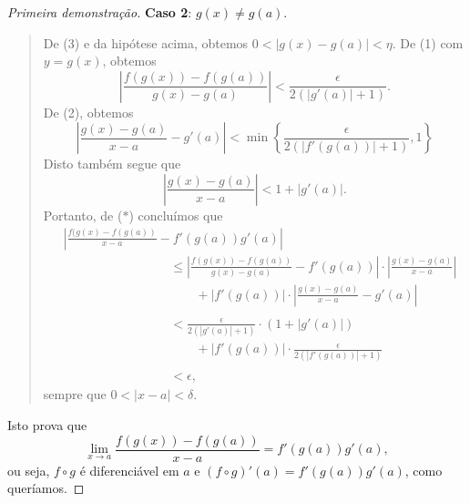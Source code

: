 \begin{proof}[Primeira demonstração]
	\textbf{Caso 2}: $g(x)\neq g(a)$.
	\begin{quote}
		De (3) e da hipótese acima, obtemos $0<|g(x)-g(a)|<\eta$. De (1) com $y=g(x)$, obtemos
		\[\left|\frac{f(g(x))-f(g(a))}{g(x)-g(a)}\right|<\frac{\epsilon}{2(|g'(a)|+1)}.\]
		De (2), obtemos
		\[\left|\frac{g(x)-g(a)}{x-a}-g'(a)\right|<\min\left\{\frac{\epsilon}{2(|f'(g(a))|+1)},1\right\}\]
		Disto também segue que
		\[\left|\frac{g(x)-g(a)}{x-a}\right|< 1+|g'(a)|.\]
		Portanto, de ($\ast$) concluímos que
		\begin{align*}
		&\left|\frac{f(g(x)-f(g(a))}{x-a}-f'(g(a))g'(a)\right|\\
			&\hspace{100pt}\leq\left|\frac{f(g(x))-f(g(a))}{g(x)-g(a)}-f'(g(a))\right|\cdot\left|\frac{g(x)-g(a)}{x-a}\right|\\
			&\hspace{100pt}\qquad +\left|f'(g(a))\right|\cdot\left|\frac{g(x)-g(a)}{x-a}-g'(a)\right|\\
			& \\
			&\hspace{100pt}<\frac{\epsilon}{2(|g'(a)|+1)}\cdot(1+|g'(a)|)\\
			&\hspace{100pt}\qquad +\left|f'(g(a))\right|\cdot\frac{\epsilon}{2(|f'(g(a))|+1)}\\
			 & \\
			&\hspace{100pt}<\epsilon,
		\end{align*}
		sempre que $0<|x-a|<\delta$.
	\end{quote}
	
	Isto prova que
	\[\lim_{x\to a}\frac{f(g(x))-f(g(a))}{x-a}=f'(g(a))g'(a),\]
	ou seja, $f\circ g$ é diferenciável em $a$ e $(f\circ g)'(a)=f'(g(a))g'(a)$, como queríamos.
\end{proof}

